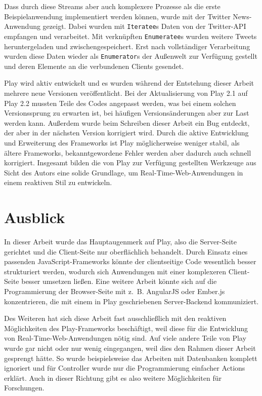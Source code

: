 Dass durch diese Streams aber auch komplexere Prozesse als die erste Beispielanwendung implementiert werden können, wurde mit der Twitter News-Anwendung gezeigt.
Dabei wurden mit \lstinline|Iteratee|s Daten von der Twitter-API empfangen und verarbeitet.
Mit verknüpften \lstinline|Enumeratee|s wurden weitere Tweets heruntergeladen und zwischengespeichert.
Erst nach vollständiger Verarbeitung wurden diese Daten wieder als \lstinline|Enumerator|s der Außenwelt zur Verfügung gestellt und deren Elemente an die verbundenen Clients gesendet.

Play wird aktiv entwickelt und es wurden während der Entstehung dieser Arbeit mehrere neue Versionen veröffentlicht.
Bei der Aktualisierung von Play 2.1 auf Play 2.2 mussten Teile des Codes angepasst werden, was bei einem solchen Versionssprung zu erwarten ist, bei häufigen Versionsänderungen aber zur Last werden kann.
Außerdem wurde beim Schreiben dieser Arbeit ein Bug entdeckt, der aber in der nächsten Version korrigiert wird.
Durch die aktive Entwicklung und Erweiterung des Frameworks ist Play möglicherweise weniger stabil, als ältere Frameworks, bekanntgewordene Fehler werden aber dadurch auch schnell korrigiert.
Insgesamt bilden die von Play zur Verfügung gestellten Werkzeuge aus Sicht des Autors eine solide Grundlage, um Real-Time-Web-Anwendungen in einem reaktiven Stil zu entwickeln.


\section{Ausblick} %
\label{sec:ausblick}

In dieser Arbeit wurde das Hauptaugenmerk auf Play, also die Server-Seite gerichtet und die Client-Seite nur oberflächlich behandelt.
Durch Einsatz eines passenden JavaScript-Frameworks könnte der clientseitige Code wesentlich besser strukturiert werden, wodurch sich Anwendungen mit einer komplexeren Client-Seite besser umsetzen ließen.
Eine weitere Arbeit könnte sich auf die Programmierung der Browser-Seite mit z.~B. AngularJS \cite[vgl.][]{angular_js} oder \mbox{Ember.js} \cite[vgl.][]{ember_js} konzentrieren, die mit einem in Play geschriebenen Server-Backend kommuniziert. %

Des Weiteren hat sich diese Arbeit fast ausschließlich mit den reaktiven Möglichkeiten des Play-Frameworks beschäftigt, weil diese für die Entwicklung von Real-Time-Web-Anwendungen nötig sind.
Auf viele andere Teile von Play wurde gar nicht oder nur wenig eingegangen, weil dies den Rahmen dieser Arbeit gesprengt hätte.
So wurde beispielsweise das Arbeiten mit Datenbanken komplett ignoriert und für Controller wurde nur die Programmierung einfacher Actions erklärt.
Auch in dieser Richtung gibt es also weitere Möglichkeiten für Forschungen.

